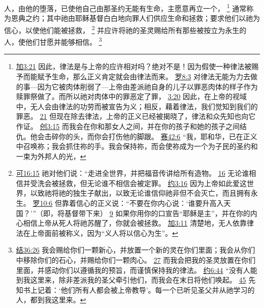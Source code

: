\documentclass[12pt, a4paper, oneside]{ctexart}
\newcounter{parnum}[section]
\newcommand{\N}{%
   \noindent\refstepcounter{parnum}%
    \makebox[\parindent][l]{\textbf{\arabic{parnum}.}}}
\begin{document}
\N 人，由他的堕落，已使他自己由那圣约无能有生命，主愿意再立一个，
	\footnote {
		\href{https://biblehub.com/galatians/3-21.htm}{加3:21} 因此，律法是与上帝的应许相对吗？绝对不是！因为假使一种律法被赐予而能赋予生命，那么正义肯定就会由律法而来。
		\href{https://biblehub.com/romans/8-3.htm}{罗8:3} 对律法无能为力去做的事---因为它被肉体削弱了---上帝由差派祂自身的儿子以罪恶肉体的样子作为赎罪祭做了。而所以祂对肉体中的罪恶定了罪，
		\href{https://biblehub.com/romans/3-20.htm}{3:20} 因此，在上帝的视域中，无人会由律法的功劳而被宣告为义；相反，藉着律法，我们觉知到我们的罪恶。
		\href{https://biblehub.com/romans/3-21.htm}{21} 但现在除去律法，上帝的正义已经被揭晓了，律法和众先知也向它作证。
		\href{https://biblehub.com/genesis/3-15.htm}{创3:15} 而我会在你和那女人之间，并在你的孩子和她的孩子之间结仇。他会击碎你的头，而你会打伤他的脚跟。
		\href{https://biblehub.com/isaiah/42-6.htm}{赛42:6} “我，耶和华，已在正义中召唤祢；我会抓住祢的手。我会保持祢，而会使祢成为一个为子民的圣约和一束为外邦人的光，
	}
	通常称为恩典之约；其中祂由耶稣基督白白地向罪人们供应生命和拯救；要求他们以祂为信心，以使他们能被拯救，
	\footnote {
		\href{https://biblehub.com/mark/16-15.htm}{可16:15} 祂对他们说：“走进全世界，并把福音传讲给所有造物。
		\href{https://biblehub.com/mark/16-16.htm}{16} 无论谁相信并受洗会被拯救，但无论谁不相信会被定罪。
		\href{https://biblehub.com/john/3-16.htm}{约3:16} 因为上帝如此爱这世界，以致祂将祂的独生子献出，以致无论谁信仰祂非但不会灭亡，而且拥有永生。
		\href{https://biblehub.com/romans/10-6.htm}{罗10:6} 但靠着信心的正义说：“不要在你内心说：‘谁要升高入天国？’”（即，将基督带下来）
		\href{https://biblehub.com/romans/10-9.htm}{9} 如果你用你的口宣告“耶稣是主”，并在你的内心相信上帝从死人将祂苏醒了，你就会被拯救。
		\href{https://biblehub.com/galatians/3-11.htm}{加3:11} 清楚地，无人依靠律法在上帝面前被称义，因为“义人将以信心为生”。
	}
	并应许将祂的圣灵赐给所有那些被按立为永生的人，使他们甘愿并能够相信。
	\footnote {
		\href{https://biblehub.com/ezekiel/36-26.htm}{结36:26} 我会赐给你们一颗新心，并放置一个新的灵在你们里面；我会从你们中移除你们的石心，并赐给你们一颗肉心。
		\href{https://biblehub.com/ezekiel/36-27.htm}{27} 而我会把我的圣灵放置在你们里面，并感动你们以遵循我的预旨，而谨慎保持我的律法。
		\href{https://biblehub.com/john/6-44.htm}{约6:44} “没有人能到我这里来，除非差派我的圣父牵引他们，而我会在末日将他们唤起。
		\href{https://biblehub.com/john/6-45.htm}{45} 先知书上记着：‘他们所有人都会被上帝教导’。每一个已听见圣父并从祂学习的人，都到我这里来。
	}
\end{document}
